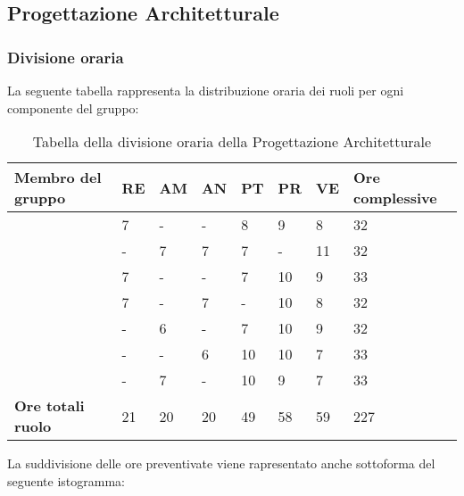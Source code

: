 \subsection{Progettazione Architetturale}

\subsubsection{Divisione oraria}
La seguente tabella rappresenta la distribuzione oraria dei ruoli per ogni componente del gruppo:
\renewcommand{\arraystretch}{2}
\begin{longtable}[h!] { C{4cm} C{1cm} C{1cm} C{1cm} C{1cm} C{1cm} C{1cm} C{3cm}}
\caption{Tabella della divisione oraria della Progettazione Architetturale}\\
\rowcolor{\primaryColor}

\textcolor{\secondaryColor}{\textbf{Membro del gruppo}} & 
\textcolor{\secondaryColor}{\textbf{RE}} & 
\textcolor{\secondaryColor}{\textbf{AM}} & 
\textcolor{\secondaryColor}{\textbf{AN}} & 
\textcolor{\secondaryColor}{\textbf{PT}} & 
\textcolor{\secondaryColor}{\textbf{PR}} & 
\textcolor{\secondaryColor}{\textbf{VE}} & 
\textcolor{\secondaryColor}{\textbf{Ore complessive}}\\	
\endhead
        
\AW{}                     & 7  & - & -  & 8 & 9 & 8 & 32 \\
\AT{}                     & -  & 7 & 7  & 7 & - & 11 & 32 \\
\AD{}                     & 7  & - & -  & 7 & 10 & 9 & 33 \\
\EC{}                     & 7  & - & 7  & - & 10 & 8 & 32 \\
\EM{}                     & -  & 6 & -  & 7 & 10 & 9 & 32 \\
\FP{}                     & -  & - & 6  & 10 & 10 & 7 & 33 \\
\GG{}                     & -  & 7 & -  & 10 & 9 & 7 & 33 \\
\textbf{Ore totali ruolo} & 21 & 20 & 20 & 49 & 58 & 59 & 227

		
\end{longtable}
La suddivisione delle ore preventivate viene rapresentato anche sottoforma del seguente istogramma:
